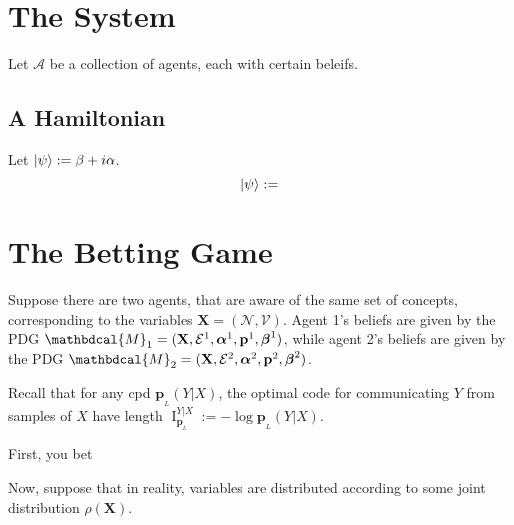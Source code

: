 \documentclass[twoside]{article} %
\theoremstyle{plain}
\theoremstyle{definition}
\let\H\relax
\DeclareMathOperator{\H}{\mathrm{H}} %
\DeclareMathOperator{\I}{\mathrm{I}} %
\DeclarePairedDelimiter\ket{\lvert}{\rangle}
\newcommand{\mat}[1]{\mathbf{#1}}
\newcommand{\ssub}[1]{_{\!_{#1}\!}}
\newcommand{\bp}[1][L]{\mat{p}\ssub{#1}}
\newcommand{\V}{\mathcal V}
\newcommand{\N}{\mathcal N}
\newcommand{\Ed}{\mathcal E}
\newcommand{\balpha}{\boldsymbol\alpha}
\newcommand{\bbeta}{\boldsymbol\beta}
\newcommand{\dg}[1]{\mathbdcal{#1}}
\newcommand{\TODO}[1][INCOMPLETE]{{\centering\Large\color{red}$\langle$~\texttt{#1}~$\rangle$\par}}
\begin{document}

\section{The System}
    Let $\mathcal A$ be a collection of agents, each with certain beleifs.


\subsection{A Hamiltonian}
Let $\ket\psi := \beta  + i\alpha$.
\[
    \H \ket\psi :=
\]

\section{The Betting Game}
    Suppose there are two agents, that are aware of the same set of concepts, corresponding to the variables $\mathbf X = (\N, \V)$.
    Agent 1's beliefs are given by the PDG
    $\dg M_1 = (\mat X, \Ed^1,\balpha^1, \mat p^1, \bbeta^1)$,
    while agent 2's beliefs are given by the PDG
    $\dg M_2 = (\mat X, \Ed^2,\balpha^2, \mat p^2, \bbeta^2)$.

    Recall that for any cpd $\bp(Y|X)$, the optimal code for communicating $Y$ from samples of $X$ have length $\I^{Y|X}_{\bp} := - \log {\bp(Y|X)}$.

    First, you bet

    Now, suppose that in reality, variables are distributed according to some joint distribution $\rho(\mathbf X)$.



\appendix



\section{}

%
%
\end{document}
